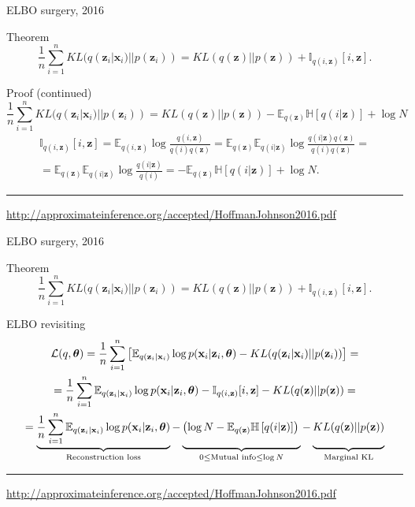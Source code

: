 \documentclass{beamer}
\newcommand{\bx}{\mathbf{x}}
\newcommand{\bz}{\mathbf{z}}
\newcommand{\btheta}{\boldsymbol{\theta}}
\begin{document}
\begin{frame}{ELBO surgery, 2016}
\begin{block}{Theorem}
\[
    \frac{1}{n} \sum_{i=1}^n KL(q(\bz_i | \bx_i) || p(\bz_i)) = KL(q(\bz) || p(\bz)) + \mathbb{I}_{q(i, \bz)} [i, \bz].
\]
\end{block}
\begin{block}{Proof (continued)}
{\footnotesize
\[
    \frac{1}{n} \sum_{i=1}^n KL(q(\bz_i | \bx_i) || p(\bz_i)) = KL (q(\bz) || p(\bz)) - \mathbb{E}_{q(\bz)} \mathbb{H} \left[q(i | \bz) \right] + \log N
\]
\begin{multline*}
    \mathbb{I}_{q(i, \bz)} [i, \bz] = \mathbb{E}_{q(i, \bz)} \log \frac{q(i, \bz)}{q(i)q(\bz)} = \mathbb{E}_{q(\bz)} \mathbb{E}_{q(i | \bz)} \log \frac{q(i | \bz) q(\bz)}{q(i)q(\bz)} = \\
    = \mathbb{E}_{q(\bz)} \mathbb{E}_{q(i | \bz)} \log \frac{q(i | \bz)}{q(i)} = - \mathbb{E}_{q(\bz)} \mathbb{H} \left[ q(i | \bz) \right] + \log N.
\end{multline*}
}
\end{block}
\vfill
\hrule\medskip
{\scriptsize \href{http://approximateinference.org/accepted/HoffmanJohnson2016.pdf}{http://approximateinference.org/accepted/HoffmanJohnson2016.pdf}}
\end{frame}
\begin{frame}{ELBO surgery, 2016}
\begin{block}{Theorem}
\[
    \frac{1}{n} \sum_{i=1}^n KL(q(\bz_i | \bx_i) || p(\bz_i)) = KL(q(\bz) || p(\bz)) + \mathbb{I}_{q(i, \bz)} [i, \bz].
\]
\end{block}
\begin{block}{ELBO revisiting}
{\footnotesize
\begin{multline*}
    \mathcal{L}(q, \btheta) = \frac{1}{n} \sum_{i=1}^n \left[ \mathbb{E}_{q(\bz_i | \bx_i)} \log p(\bx_i | \bz_i, \btheta) - KL(q(\bz_i | \bx_i) || p(\bz_i)) \right] = \\
    = \frac{1}{n} \sum_{i=1}^n \mathbb{E}_{q(\bz_i | \bx_i)} \log p(\bx_i | \bz_i, \btheta) - \mathbb{I}_{q(i, \bz)} [i, \bz] - KL(q(\bz) || p(\bz)) = \\
    = \underbrace{\frac{1}{n} \sum_{i=1}^n \mathbb{E}_{q(\bz_i | \bx_i)} \log p(\bx_i | \bz_i, \btheta)}_{\text{Reconstruction loss}} - \underbrace{\left(\log N - \mathbb{E}_{q(\bz)} \mathbb{H} \left[ q(i | \bz) \right] \right)\vphantom{\sum_{i=1}} }_{0 \leq \text{Mutual info} \leq \log N } - \underbrace{KL(q(\bz) || p(\bz))\vphantom{\sum_{i=1}}}_{\text{Marginal KL}}
\end{multline*}
}
\end{block}
\vfill
\hrule\medskip
{\scriptsize \href{http://approximateinference.org/accepted/HoffmanJohnson2016.pdf}{http://approximateinference.org/accepted/HoffmanJohnson2016.pdf}}
\end{frame}
\end{document}
